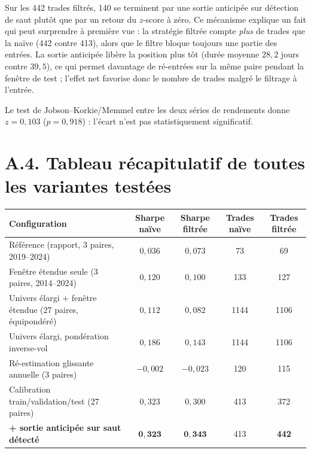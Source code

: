 \documentclass{article}
\begin{document}
Sur les 442 trades filtrés, 140 se terminent par une sortie anticipée sur détection de saut plutôt que par un retour du $z$-score à zéro. Ce mécanisme explique un fait qui peut surprendre à première vue : la stratégie filtrée compte \emph{plus} de trades que la naïve (442 contre 413), alors que le filtre bloque toujours une partie des entrées. La sortie anticipée libère la position plus tôt (durée moyenne $28{,}2$ jours contre $39{,}5$), ce qui permet davantage de ré-entrées sur la même paire pendant la fenêtre de test ; l'effet net favorise donc le nombre de trades malgré le filtrage à l'entrée.

Le test de Jobson--Korkie/Memmel entre les deux séries de rendements donne $z=0{,}103$ ($p=0{,}918$) : l'écart n'est pas statistiquement significatif.

\section*{A.4. Tableau récapitulatif de toutes les variantes testées}
\begin{center}
\begin{tabular}{lcccc}
\toprule
Configuration & Sharpe naïve & Sharpe filtrée & Trades naïve & Trades filtrée \\
\midrule
Référence (rapport, 3 paires, 2019--2024) & $0{,}036$ & $0{,}073$ & 73 & 69 \\
Fenêtre étendue seule (3 paires, 2014--2024) & $0{,}120$ & $0{,}100$ & 133 & 127 \\
Univers élargi + fenêtre étendue (27 paires, équipondéré) & $0{,}112$ & $0{,}082$ & 1144 & 1106 \\
Univers élargi, pondération inverse-vol & $0{,}186$ & $0{,}143$ & 1144 & 1106 \\
Ré-estimation glissante annuelle (3 paires) & $-0{,}002$ & $-0{,}023$ & 120 & 115 \\
Calibration train/validation/test (27 paires) & $0{,}323$ & $0{,}300$ & 413 & 372 \\
\textbf{+ sortie anticipée sur saut détecté} & $\mathbf{0{,}323}$ & $\mathbf{0{,}343}$ & 413 & \textbf{442} \\
\bottomrule
\end{tabular}
\end{center}
\end{document}
